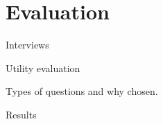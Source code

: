 \section{Evaluation}

Interviews

Utility evaluation

Types of questions and why chosen. \cite{Walker2013Qualitative}

Results